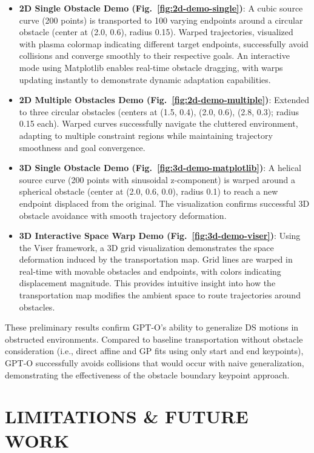 \documentclass[a4paper, 10pt, conference]{ieeeconf}
\begin{document}
\begin{itemize}
    \item \textbf{2D Single Obstacle Demo (Fig.~\ref{fig:2d-demo-single})}: A cubic source curve (200 points) is transported to 100 varying endpoints around a circular obstacle (center at (2.0, 0.6), radius 0.15). Warped trajectories, visualized with plasma colormap indicating different target endpoints, successfully avoid collisions and converge smoothly to their respective goals. An interactive mode using Matplotlib enables real-time obstacle dragging, with warps updating instantly to demonstrate dynamic adaptation capabilities.

    \item \textbf{2D Multiple Obstacles Demo (Fig.~\ref{fig:2d-demo-multiple})}: Extended to three circular obstacles (centers at (1.5, 0.4), (2.0, 0.6), (2.8, 0.3); radius 0.15 each). Warped curves successfully navigate the cluttered environment, adapting to multiple constraint regions while maintaining trajectory smoothness and goal convergence.

    \item \textbf{3D Single Obstacle Demo (Fig.~\ref{fig:3d-demo-matplotlib})}: A helical source curve (200 points with sinusoidal z-component) is warped around a spherical obstacle (center at (2.0, 0.6, 0.0), radius 0.1) to reach a new endpoint displaced from the original. The visualization confirms successful 3D obstacle avoidance with smooth trajectory deformation.

    \item \textbf{3D Interactive Space Warp Demo (Fig.~\ref{fig:3d-demo-viser})}: Using the Viser framework, a 3D grid visualization demonstrates the space deformation induced by the transportation map. Grid lines are warped in real-time with movable obstacles and endpoints, with colors indicating displacement magnitude. This provides intuitive insight into how the transportation map modifies the ambient space to route trajectories around obstacles.
\end{itemize}

These preliminary results confirm GPT-O's ability to generalize DS motions in obstructed environments. Compared to baseline transportation without obstacle consideration (i.e., direct affine and GP fits using only start and end keypoints), GPT-O successfully avoids collisions that would occur with naive generalization, demonstrating the effectiveness of the obstacle boundary keypoint approach.

\section{LIMITATIONS \& FUTURE WORK}
\end{document}
